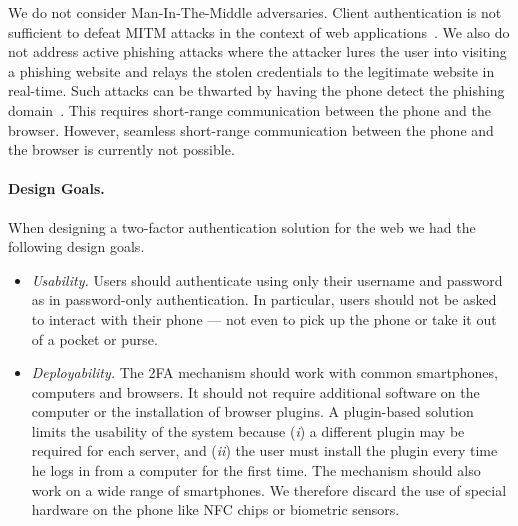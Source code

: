 We do not consider Man-In-The-Middle adversaries. Client authentication is not sufficient to defeat MITM attacks in the context of web applications~\cite{karapanos14usenix}.
We also do not address active phishing attacks where the attacker lures the user into visiting a phishing website and relays the stolen credentials to the legitimate website in real-time. Such attacks can be thwarted by having the phone detect the phishing domain~\cite{czeskis12ccs,parno06fc}. This requires short-range communication between the phone and the browser. However, seamless short-range communication between the phone and the browser is currently not possible.



\paragraph{Design Goals.} When designing a two-factor authentication solution for the web we had the following design goals.

\begin{itemize}%

\item   \emph{Usability.}
        Users should authenticate using only their username and password as in password-only authentication.
        In particular, users should not be asked to interact with their phone --- not even to pick up the phone or take it out of a pocket or purse.
\item   \emph{Deployability.}
        The 2FA mechanism should work with common smartphones, computers and browsers.
        It should not require additional software on the computer or the installation of browser plugins.
        A plugin-based solution limits the usability of the system because (\emph{i}) a different plugin may be required for each server,
        and (\emph{ii}) the user must install the plugin every time he logs in from a computer for the first time.
        The mechanism should also work on a wide range of smartphones.
        We therefore discard the use of special hardware on the phone like NFC chips or biometric sensors.
\end{itemize}


